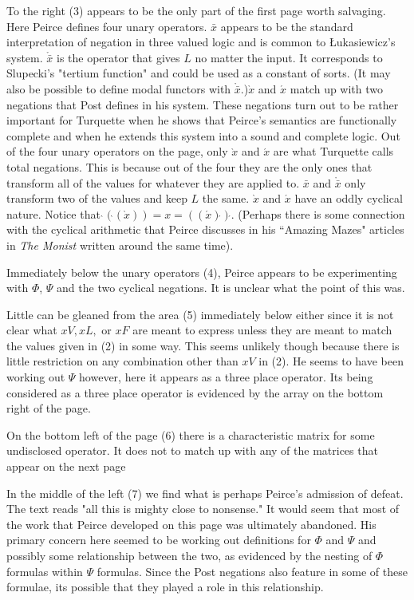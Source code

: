 \documentclass[12pt]{article}
\begin{document}
To the right (3) appears to be the only part of the first page worth salvaging. Here Peirce defines four unary operators. $\bar{x}$ appears to be the standard interpretation of negation in three valued logic and is common to Łukasiewicz's system. $\mathring{\bar{x}}$ is the operator that gives $L$ no matter the input. It corresponds to Slupecki's "tertium function" and could be used as a constant of sorts. (It may also be possible to define modal functors with $\mathring{\bar{x}}$.)$\grave{x}$ and $\acute{x}$ match up with two negations that Post defines in his system. These negations turn out to be rather important for Turquette when he shows that Peirce's semantics are functionally complete and when he extends this system into a sound and complete logic. Out of the four unary operators on the page, only $\grave{x}$ and $\acute{x}$ are what Turquette calls total negations. This is because out of the four they are the only ones that transform all of the values for whatever they are applied to. $\bar{x}$ and $\mathring{\bar{x}}$ only transform two of the values and keep $L$ the same. $\grave{x}$ and $\acute{x}$ have an oddly cyclical nature. Notice that $\grave{}(\grave{}(\grave{x}))=x=((\acute{x})\acute{})\acute{}$. (Perhaps there is some connection with the cyclical arithmetic that Peirce discusses in his ``Amazing Mazes" articles in \textit{The Monist} written around the same time).

Immediately below the unary operators (4), Peirce appears to be experimenting with $\Phi$, $\Psi$ and the two cyclical negations. It is unclear what the point of this was.

Little can be gleaned from the area (5) immediately below either since it is not clear what $xV, xL,$ or $xF$ are meant to express unless they are meant to match the values given in (2) in some way. This seems unlikely though because there is little restriction on any combination other than $xV$ in (2). He seems to have been working out $\Psi$ however, here it appears as a three place operator. Its being considered as a three place operator is evidenced by the array on the bottom right of the page.

On the bottom left of the page (6) there is a characteristic matrix for some undisclosed operator. It does not to match up with any of the matrices that appear on the next page

In the middle of the left (7) we find what is perhaps Peirce's admission of defeat. The text reads "all this is mighty close to nonsense." It would seem that most of the work that Peirce developed on this page was ultimately abandoned. His primary concern here seemed to be working out definitions for $\Phi$ and $\Psi$ and possibly some relationship between the two, as evidenced by the nesting of $\Phi$ formulas within $\Psi$ formulas. Since the Post negations also feature in some of these formulae, its possible that they played a role in this relationship.
\end{document}
